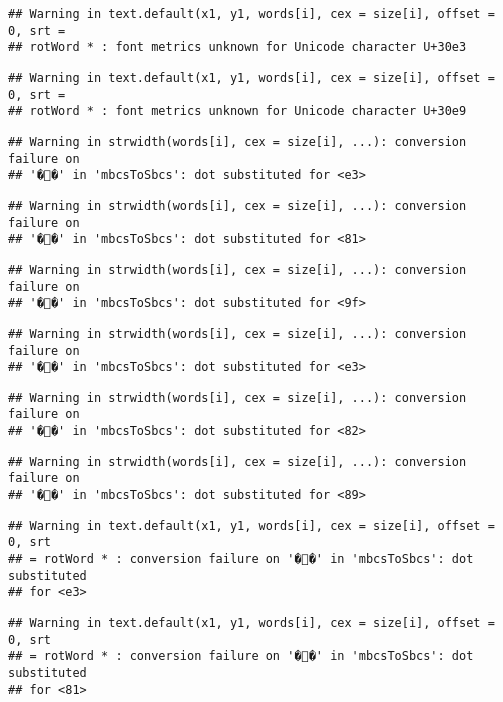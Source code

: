 \documentclass[]{article}
\begin{document}
\begin{verbatim}
## Warning in text.default(x1, y1, words[i], cex = size[i], offset = 0, srt =
## rotWord * : font metrics unknown for Unicode character U+30e3
\end{verbatim}

\begin{verbatim}
## Warning in text.default(x1, y1, words[i], cex = size[i], offset = 0, srt =
## rotWord * : font metrics unknown for Unicode character U+30e9
\end{verbatim}

\begin{verbatim}
## Warning in strwidth(words[i], cex = size[i], ...): conversion failure on
## '��' in 'mbcsToSbcs': dot substituted for <e3>
\end{verbatim}

\begin{verbatim}
## Warning in strwidth(words[i], cex = size[i], ...): conversion failure on
## '��' in 'mbcsToSbcs': dot substituted for <81>
\end{verbatim}

\begin{verbatim}
## Warning in strwidth(words[i], cex = size[i], ...): conversion failure on
## '��' in 'mbcsToSbcs': dot substituted for <9f>
\end{verbatim}

\begin{verbatim}
## Warning in strwidth(words[i], cex = size[i], ...): conversion failure on
## '��' in 'mbcsToSbcs': dot substituted for <e3>
\end{verbatim}

\begin{verbatim}
## Warning in strwidth(words[i], cex = size[i], ...): conversion failure on
## '��' in 'mbcsToSbcs': dot substituted for <82>
\end{verbatim}

\begin{verbatim}
## Warning in strwidth(words[i], cex = size[i], ...): conversion failure on
## '��' in 'mbcsToSbcs': dot substituted for <89>
\end{verbatim}

\begin{verbatim}
## Warning in text.default(x1, y1, words[i], cex = size[i], offset = 0, srt
## = rotWord * : conversion failure on '��' in 'mbcsToSbcs': dot substituted
## for <e3>
\end{verbatim}

\begin{verbatim}
## Warning in text.default(x1, y1, words[i], cex = size[i], offset = 0, srt
## = rotWord * : conversion failure on '��' in 'mbcsToSbcs': dot substituted
## for <81>
\end{verbatim}
\end{document}
